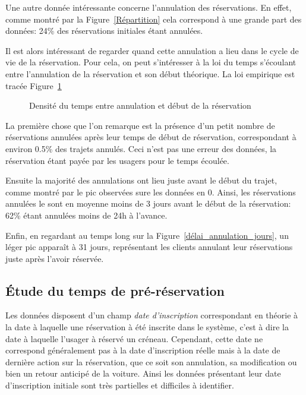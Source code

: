 \documentclass[12pt,a4paper]{article}
\newcommand{\1}[1]{\mathbbm{1}_{\{#1\}} }
\theoremstyle{definition}
\begin{document}
{Une autre donnée intéressante concerne l'annulation des réservations. En effet, comme montré par la Figure~\ref{Répartition} cela correspond à une grande part des données: 24\% des réservations initiales étant annulées. 

Il est alors intéressant de regarder quand cette annulation a lieu dans le cycle de vie de la réservation. Pour cela, on peut s'intéresser à la loi du temps s'écoulant entre l'annulation de la réservation et son début théorique. La loi empirique est tracée Figure~\ref{délai_annulation_début} 

\begin{figure}[!h]
\centering
{}
\caption{Densité du temps entre annulation et début de la réservation}
\label{délai_annulation_début}
\end{figure}


La première chose que l'on remarque est la présence d'un petit nombre de réservations annulées après leur temps de début de réservation, correspondant à environ 0.5\% des trajets annulés. Ceci n'est pas une erreur des données, la réservation étant payée par les usagers pour le temps écoulée.

Ensuite la majorité des annulations ont lieu juste avant le début du trajet, comme montré par le pic observées sure les données en 0. Ainsi, les réservations annulées le sont en moyenne moins de 3 jours avant le début de la réservation: 62\% étant annulées moins de 24h à l'avance.

Enfin, en regardant au temps long sur la Figure~\ref{délai_annulation_jours}, un léger pic apparaît à 31 jours, représentant les clients annulant leur réservations juste après l'avoir réservée.


	
\subsection{Étude du temps de pré-réservation}

Les données disposent d'un champ \emph{date d'inscription} correspondant en théorie à la date à laquelle une réservation à été inscrite dans le système, c'est à dire la date à laquelle l'usager à réservé un créneau. Cependant, cette date ne correspond généralement pas à la date d'inscription réelle mais à la date de dernière action sur la réservation, que ce soit son annulation, sa modification ou bien un retour anticipé de la voiture. Ainsi les données présentant leur  date d'inscription initiale sont très partielles et difficiles à identifier.

}
\end{document}
